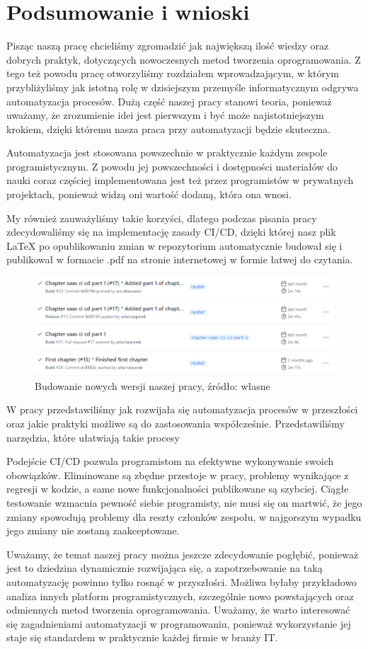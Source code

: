 \section{Podsumowanie i wnioski}
Pisząc naszą pracę chcieliśmy zgromadzić jak największą ilość wiedzy oraz dobrych praktyk, dotyczących nowoczesnych metod tworzenia oprogramowania. Z tego też powodu pracę otworzyliśmy rozdziałem wprowadzającym, w którym przybliżyliśmy jak istotną rolę w dzisiejszym przemyśle informatycznym odgrywa automatyzacja procesów. Dużą część naszej pracy stanowi teoria, ponieważ uważamy, że zrozumienie idei jest pierwszym i być może najistotniejszym krokiem, dzięki któremu nasza praca przy automatyzacji będzie skuteczna.

Automatyzacja jest stosowana powszechnie w praktycznie każdym zespole programistycznym. Z powodu jej powszechności i dostępności materiałów do nauki coraz częściej implementowana jest też przez programistów w prywatnych projektach, ponieważ widzą oni wartość dodaną, która ona wnosi. 

My również zauważyliśmy takie korzyści, dlatego podczas pisania pracy zdecydowaliśmy się na implementację zasady CI/CD, dzięki której nasz plik \LaTeX{} po opublikowaniu zmian w repozytorium automatycznie budował się i publikował w formacie .pdf na stronie internetowej w formie łatwej do czytania. 

\begin{figure}[htbp]
    \centering
    \includegraphics[width=12cm]{images/podsumowanie.png}
    \caption{Budowanie nowych wersji naszej pracy, źródło: własne}
    \label{fig:podsumowanie}
\end{figure}

W pracy przedstawiliśmy jak rozwijała się automatyzacja procesów w przeszłości oraz jakie praktyki możliwe są do zastosowania współcześnie. Przedstawiliśmy narzędzia, które ułatwiają takie procesy 

Podejście CI/CD pozwala programistom na efektywne wykonywanie swoich obowiązków. Eliminowane są zbędne przestoje w pracy, problemy wynikające z regresji w kodzie, a same nowe funkcjonalności publikowane są szybciej. Ciągłe testowanie wzmacnia pewność siebie programisty, nie musi się on martwić, że jego zmiany spowodują problemy dla reszty członków zespołu, w najgorszym wypadku jego zmiany nie zostaną zaakceptowane. 

Uważamy, że temat naszej pracy można jeszcze zdecydowanie pogłębić, ponieważ jest to dziedzina dynamicznie rozwijająca się, a zapotrzebowanie na taką automatyzację powinno tylko rosnąć w przyszłości. Możliwa byłaby przykładowo analiza innych platform programistycznych, szczególnie nowo powstających oraz odmiennych metod tworzenia oprogramowania. Uważamy, że warto interesować się zagadnieniami automatyzacji w programowaniu, ponieważ wykorzystanie jej staje się standardem w praktycznie każdej firmie w branży IT.